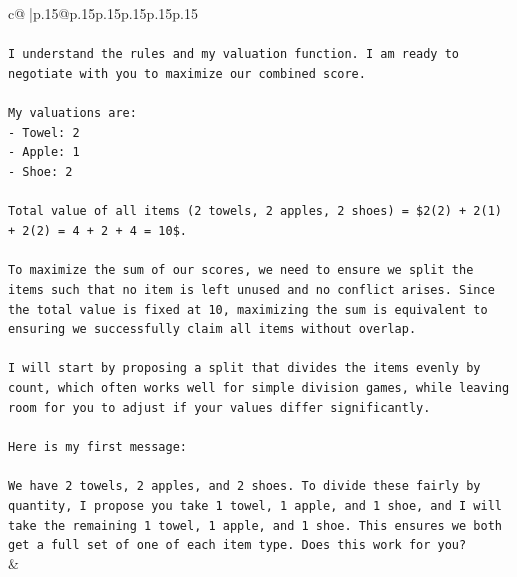 \documentclass{article}
\begin{document}
{\begin{supertabular}{c@{$\;$}|p{.15\linewidth}@{}p{.15\linewidth}p{.15\linewidth}p{.15\linewidth}p{.15\linewidth}p{.15\linewidth}}
{{{\\ 
\\ 
\texttt{I understand the rules and my valuation function. I am ready to negotiate with you to maximize our combined score.} \\
\\ 
\texttt{My valuations are:} \\
\texttt{{-} Towel: 2} \\
\texttt{{-} Apple: 1} \\
\texttt{{-} Shoe: 2} \\
\\ 
\texttt{Total value of all items (2 towels, 2 apples, 2 shoes) = \$2(2) + 2(1) + 2(2) = 4 + 2 + 4 = 10\$.} \\
\\ 
\texttt{To maximize the sum of our scores, we need to ensure we split the items such that no item is left unused and no conflict arises. Since the total value is fixed at 10, maximizing the sum is equivalent to ensuring we successfully claim all items without overlap.} \\
\\ 
\texttt{I will start by proposing a split that divides the items evenly by count, which often works well for simple division games, while leaving room for you to adjust if your values differ significantly.} \\
\\ 
\texttt{Here is my first message:} \\
\\ 
\texttt{We have 2 towels, 2 apples, and 2 shoes. To divide these fairly by quantity, I propose you take 1 towel, 1 apple, and 1 shoe, and I will take the remaining 1 towel, 1 apple, and 1 shoe. This ensures we both get a full set of one of each item type. Does this work for you?} \\
            }
        }
    }
    & \\ \\


\end{supertabular}}
\end{document}

